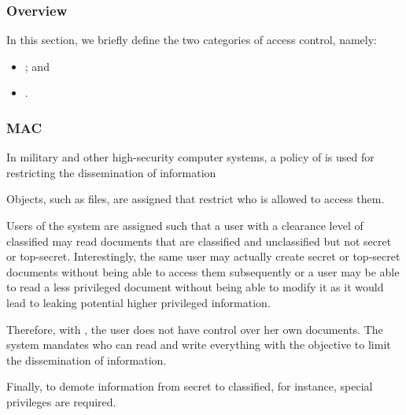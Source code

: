 
\begin{frame}
  \frametitle{Overview}

  In this section, we briefly define the two categories of access control,
  namely:

  \begin{itemize}
    \item
      ; and
    \item
      .
  \end{itemize}
\end{frame}


\begin{frame}
  \frametitle{MAC}

  In military and other high-security computer systems, a policy of
   is used for restricting the
  dissemination of information

  \-

  Objects, such as files, are assigned  that restrict who
  is allowed to access them.

  \-

  Users of the system are assigned  such that a user
  with a clearance level of classified may read documents that are classified
  and unclassified but not secret or top-secret. Interestingly, the same user
  may actually create secret or top-secret documents without being able to
  access them subsequently or a user may be able to read a less privileged
  document without being able to modify it as it would lead to leaking
  potential higher privileged information.

  \-

  Therefore, with , the user does not have control over her own
  documents. The system mandates who can read and write everything with the
  objective to limit the dissemination of information.

  \-

  Finally, to demote information from secret to classified, for instance,
  special privileges are required.
\end{frame}



